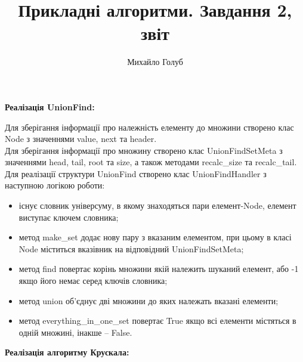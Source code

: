\documentclass{article}
\title{Прикладні алгоритми. Завдання 2, звіт}
\author{Михайло Голуб}
\begin{document}
\maketitle
\newpage

\textbf{Реалізація UnionFind:}\\\indent

Для зберігання інформації про належність елементу до множини створено клас Node з значеннями value, next та header.\\\indent
Для зберігання інформації про множину створено клас UnionFindSetMeta з значеннями head, tail, root та size, а також методами recalc\_size та recalc\_tail.\\\indent
Для реалізації структури UnionFind створено клас UnionFindHandler з наступною логікою роботи:
\begin{itemize}
\item існує словник універсуму, в якому знаходяться пари елемент-Node, елемент виступає ключем словника; 
\item метод make\_set додає нову пару з вказаним елементом, при цьому в класі Node міститься вказівник на відповідний UnionFindSetMeta;
\item метод find повертає корінь множини якій належить шуканий елемент, або -1 якщо його немає серед ключів словника;
\item метод union об'єднує дві множини до яких належать вказані елементи;
\item метод everything\_in\_one\_set повертає True якщо всі елементи містяться в одній множині, інакше -- False.
\end{itemize}


\textbf{Реалізація алгоритму Крускала:}\\\indent
\end{document}
